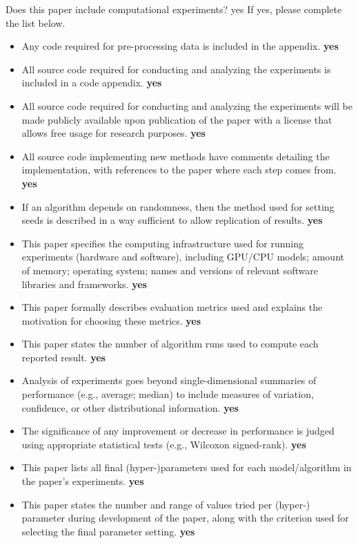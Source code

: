 Does this paper include computational experiments? yes
If yes, please complete the list below.
\begin{itemize}
    \item Any code required for pre-processing data is included in the appendix. \textbf{yes}
    \item All source code required for conducting and analyzing the experiments is included in a code appendix. \textbf{yes}
    \item All source code required for conducting and analyzing the experiments will be made publicly available upon publication of the paper with a license that allows free usage for research purposes. \textbf{yes}
    \item All source code implementing new methods have comments detailing the implementation, with references to the paper where each step comes from. \textbf{yes}
    \item If an algorithm depends on randomness, then the method used for setting seeds is described in a way sufficient to allow replication of results. \textbf{yes}
    \item This paper specifies the computing infrastructure used for running experiments (hardware and software), including GPU/CPU models; amount of memory; operating system; names and versions of relevant software libraries and frameworks. \textbf{yes}
    \item This paper formally describes evaluation metrics used and explains the motivation for choosing these metrics. \textbf{yes}
    \item This paper states the number of algorithm runs used to compute each reported result. \textbf{yes}
    \item Analysis of experiments goes beyond single-dimensional summaries of performance (e.g., average; median) to include measures of variation, confidence, or other distributional information. \textbf{yes}
    \item The significance of any improvement or decrease in performance is judged using appropriate statistical tests (e.g., Wilcoxon signed-rank). \textbf{yes}
    \item This paper lists all final (hyper-)parameters used for each model/algorithm in the paper’s experiments. \textbf{yes}
    \item This paper states the number and range of values tried per (hyper-) parameter during development of the paper, along with the criterion used for selecting the final parameter setting. \textbf{yes}
\end{itemize}
